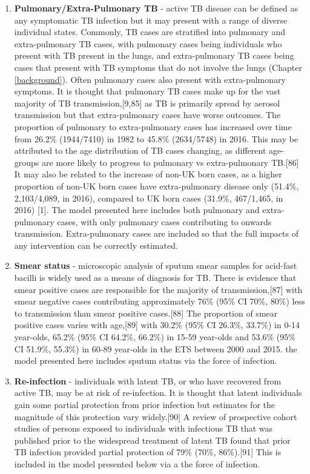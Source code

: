 \documentclass[11pt,twoside]{bristolthesis}
\begin{document}
  \begin{enumerate}
  \def\labelenumi{\arabic{enumi}.}
  \item
    \textbf{Pulmonary/Extra-Pulmonary TB} - active TB disease can be defined as any symptomatic TB infection but it may present with a range of diverse individual states. Commonly, TB cases are stratified into pulmonary and extra-pulmonary TB cases, with pulmonary cases being individuals who present with TB present in the lungs, and extra-pulmonary TB cases being cases that present with TB symptoms that do not involve the lungs (Chapter \ref{background}). Often pulmonary cases also present with extra-pulmonary symptoms. It is thought that pulmonary TB cases make up for the vast majority of TB transmission,{[}9,85{]} as TB is primarily spread by aerosol transmission but that extra-pulmonary cases have worse outcomes. The proportion of pulmonary to extra-pulmonary cases has increased over time from 26.2\% (1944/7410) in 1982 to 45.8\% (2634/5748) in 2016. This may be attributed to the age distribution of TB cases changing, as different age-groups are more likely to progress to pulmonary vs extra-pulmonary TB.{[}86{]} It may also be related to the increase of non-UK born cases, as a higher proportion of non-UK born cases have extra-pulmonary disease only (51.4\%, 2,103/4,089, in 2016), compared to UK born cases (31.9\%, 467/1,465, in 2016) {[}1{]}. The model presented here includes both pulmonary and extra-pulmonary cases, with only pulmonary cases contributing to onwards transmission. Extra-pulmonary cases are included so that the full impacts of any intervention can be correctly estimated.
  \item
    \textbf{Smear status} - microscopic analysis of sputum smear samples for acid-fast bacilli is widely used as a means of diagnosis for TB. There is evidence that smear positive cases are responsible for the majority of transmission,{[}87{]} with smear negative cases contributing approximately 76\% (95\% CI 70\%, 80\%) less to transmission than smear positive cases.{[}88{]} The proportion of smear positive cases varies with age,{[}89{]} with 30.2\% (95\% CI 26.3\%, 33.7\%) in 0-14 year-olds, 65.2\% (95\% CI 64.2\%, 66.2\%) in 15-59 year-olds and 53.6\% (95\% CI 51.9\%, 55.3\%) in 60-89 year-olds in the ETS between 2000 and 2015. the model presented here includes sputum status via the force of infection.
  \item
    \textbf{Re-infection} - individuals with latent TB, or who have recovered from active TB, may be at risk of re-infection. It is thought that latent individuals gain some partial protection from prior infection but estimates for the magnitude of this protection vary widely.{[}90{]} A review of prospective cohort studies of persons exposed to individuals with infectious TB that was published prior to the widespread treatment of latent TB found that prior TB infection provided partial protection of 79\% (70\%, 86\%).{[}91{]} This is included in the model presented below via a the force of infection.

\end{enumerate}
\end{document}
